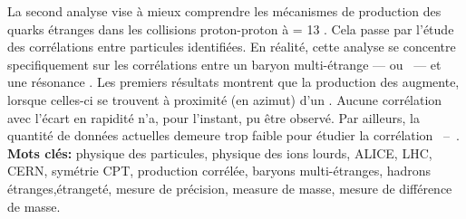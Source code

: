 La second analyse vise à mieux comprendre les mécanismes de production des quarks étranges dans les collisions proton-proton à \sqrtS =  13 \tev. Cela passe par l'étude des corrélations entre particules identifiées. En réalité, cette analyse se concentre specifiquement sur les corrélations entre un baryon multi-étrange --- \rmXiPM ou \rmOmegaPM\ --- et une résonance \rmPhiMes. Les premiers résultats montrent que la production des \rmPhiMes augmente, lorsque celles-ci se trouvent à proximité (en azimut) d'un \rmXiPM. Aucune corrélation avec l'écart en rapidité n'a, pour l'instant, pu être observé. Par ailleurs, la quantité de données actuelles demeure trop faible pour  étudier la corrélation \rmOmegaPM\ --\ \rmPhiMes.\\

\noindent\textbf{Mots clés:} physique des particules, physique des ions lourds, ALICE, LHC, CERN, symétrie CPT, production corrélée, baryons multi-étranges, hadrons étranges,\break étrangeté, mesure de précision, measure de masse, mesure de différence de masse.

